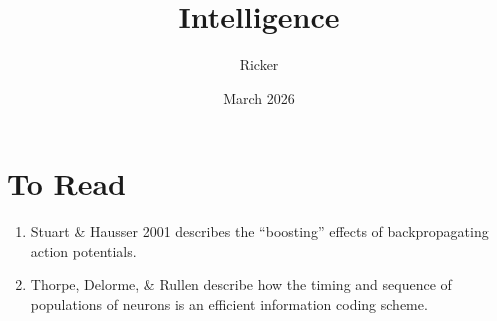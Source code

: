\documentclass[11pt, a4paper]{article}
\title{Intelligence}
\author{ Ricker }
\date{March 2026}
\begin{document}
\maketitle

\section{To Read}
\begin{enumerate}
    \item Stuart \& Hausser 2001 describes the ``boosting'' effects of backpropagating action potentials.
    \item Thorpe, Delorme, \& Rullen describe how the timing and sequence of populations of neurons is an efficient information coding scheme.
\end{enumerate}
\end{document}
